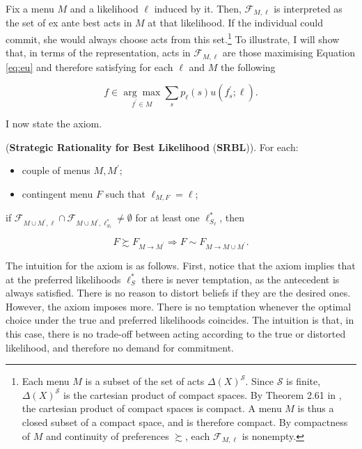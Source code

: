 Fix a menu \( M \) and a likelihood \( \ell \) induced by it. Then, \( \mathcal{F}_{M, \ell} \) is interpreted as the set of ex ante best acts in \( M \) at that likelihood. If the individual could commit, she would always choose acts from this set.\footnote{Each menu \( M \) is a subset of the set of acts \( \Delta \left( X \right)^\mathcal{S} \). Since \( \mathcal{S} \) is finite, \( \Delta \left( X \right)^\mathcal{S} \) is the cartesian product of compact spaces. By Theorem 2.61 in \citet[p. 52]{aliprantisInfiniteDimensionalAnalysis2006}, the cartesian product of compact spaces is compact. A menu \( M \) is thus a closed subset of a compact space, and is therefore compact. By compactness of \( M \) and continuity of preferences \( \succsim \), each \( \mathcal{F}_{M, \ell} \) is nonempty.} To illustrate, I will show that, in terms of the representation, acts in \( \mathcal{F}_{M, \ell} \) are those maximising Equation \eqref{eq:eu} and therefore satisfying for each \( \ell \) and \( M \) the following

\begin{equation*}
	f \in \underset{f^{\prime} \in M}{\arg \max} \sum_{s} p_{\ell} \left( s \right) u \left( f^{\prime}_{s} ; \ell \right) .
\end{equation*}

I now state the axiom.

\begin{axiom}\label{ax:srbl}

	(\textbf{Strategic Rationality for Best Likelihood} (\textbf{SRBL})). For each:
	\begin{itemize}
		\item couple of menus \( M, M^{\prime} \);
		\item contingent menu \( F \) such that \( \ell_{M,F} = \ell \);
	\end{itemize}
	if \( \mathcal{F}_{M \cup M^{\prime}, \ell} \cap \mathcal{F}_{M \cup M^{\prime}, \ell^{*}_{S_{\ell}}} \neq \emptyset \) for at least one \( \ell_{S_{\ell}}^{*} \), then

	\[
		F \succsim F_{M \rightarrow M^{\prime}} \Rightarrow F \sim F_{M \rightarrow M \cup M^{\prime}} .
	\]

\end{axiom}

The intuition for the axiom is as follows. First, notice that the axiom implies that at the preferred likelihoods \( \ell^{*}_{S} \) there is never temptation, as the antecedent is always satisfied. There is no reason to distort beliefs if they are the desired ones. However, the axiom imposes more. There is no temptation whenever the optimal choice under the true and preferred likelihoods coincides. The intuition is that, in this case, there is no trade-off between acting according to the true or distorted likelihood, and therefore no demand for commitment.

